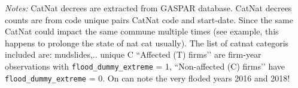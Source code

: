 \begin{table}[htbp]
{\begin{threeparttable}[b]
\begin{tabular}{l r r r r}
      \bottomrule\bottomrule
    \end{tabular}
    \begin{tablenotes}[flushleft]
      \small
      \item \emph{Notes:} CatNat decrees are extracted from GASPAR
            database. CatNat decrees counts are from code unique pairs CatNat code and start-date. Since the same CatNat could impact the same commune multiple times (see example, this happens to prolonge the state of nat cat usually). The list of catnat categoris included are: mudslides,.. unique C “Affected (T) firms’’ are
            firm-year observations with \texttt{flood\_dummy\_extreme} = 1,
            “Non-affected (C) firms’’ have \texttt{flood\_dummy\_extreme} = 0.
            On can note the very floded years 2016 and 2018!
    \end{tablenotes}
  \end{threeparttable}}
\end{table}

